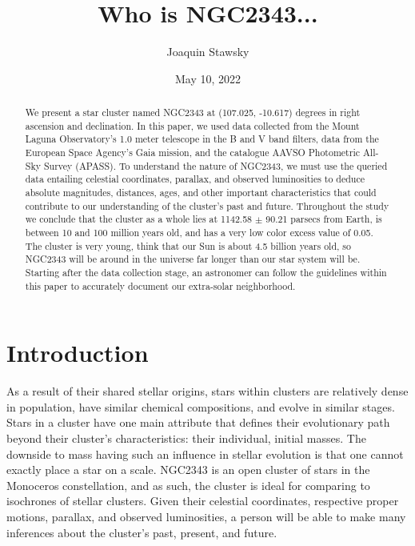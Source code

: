 \documentclass[linenumbers]{aastex631}
\begin{document}
\title{Who is NGC2343...}
\author{Joaquin Stawsky}
\date{May 10, 2022}


\begin{abstract}
We present a star cluster named NGC2343 at (107.025, -10.617) degrees in right ascension and declination. In this paper, we used data collected from the Mount Laguna Observatory's 1.0 meter telescope in the B and V band filters, data from the European Space Agency's Gaia mission, and the catalogue AAVSO Photometric All-Sky Survey (APASS). To understand the nature of NGC2343, we must use the queried data entailing celestial coordinates, parallax, and observed luminosities to deduce absolute magnitudes, distances, ages, and other important characteristics that could contribute to our understanding of the cluster's past and future. Throughout the study we conclude that the cluster as a whole lies at 1142.58 $\pm$ 90.21 parsecs from Earth, is between 10 and 100 million years old, and has a very low color excess value of 0.05. The cluster is very young, think that our Sun is about 4.5 billion years old, so NGC2343 will be around in the universe far longer than our star system will be. Starting after the data collection stage, an astronomer can follow the guidelines within this paper to accurately document our extra-solar neighborhood.
    
\end{abstract}


\section{Introduction}
As a result of their shared stellar origins, stars within clusters are relatively dense in population, have similar chemical compositions, and evolve in similar stages. Stars in a cluster have one main attribute that defines their evolutionary path beyond their cluster's characteristics: their individual, initial masses. The downside to mass having such an influence in stellar evolution is that one cannot exactly place a star on a scale. NGC2343 is an open cluster of stars in the Monoceros constellation, and as such, the cluster is ideal for comparing to isochrones of stellar clusters. Given their celestial coordinates, respective proper motions, parallax, and observed luminosities, a person will be able to make many inferences about the cluster's past, present, and future.
\end{document}

